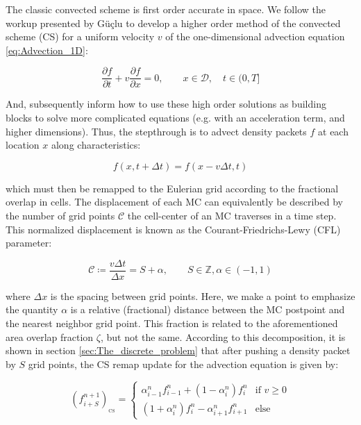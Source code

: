 \documentclass[11pt,titlepage]{report}
\begin{document}
\indent\indent The classic convected scheme is first order accurate in space. We follow the workup presented by G\"{u}\c{c}lu \cite{Guclu14} to develop a higher order method of the convected scheme (CS) for a uniform velocity $v$ of the one-dimensional advection equation \eqref{eq:Advection_1D}:

$$\frac{\partial f}{\partial t} + v\frac{\partial f}{\partial x} = 0 \label{eq:Advection_1D} , \qquad x\in\mathcal{D}, \quad t \in (0,T]$$

\noindent And, subsequently inform how to use these high order solutions as building blocks to solve more complicated equations (e.g. with an acceleration term, and higher dimensions). Thus, the stepthrough is to advect density packets $f$ at each location $x$ along characteristics:

$$f(x,t + \Delta t) = f(x - v\Delta t, t)$$

\noindent which must then be remapped to the Eulerian grid according to the fractional overlap in cells. The displacement of each MC can equivalently be described by the number of grid points $\mathcal{C}$ the cell-center of an MC traverses in a time step. This normalized displacement is known as the Courant-Friedrichs-Lewy (CFL) parameter:

\begin{equation}\mathcal{C} \coloneqq \frac{v\Delta t}{\Delta x} =  S + \alpha , \qquad S\in\mathbb{Z}, \alpha\in(-1,1)\label{eq:CFL_first}\end{equation}

\noindent where $\Delta x$ is the spacing between grid points. Here, we make a point to emphasize the quantity $\alpha$ is a relative (fractional) distance between the MC postpoint and the nearest neighbor grid point. This fraction is related to the aforementioned area overlap fraction $\zeta$, but not the same. According to this decomposition, it is shown in section \ref{sec:The_discrete_problem} that after pushing a density packet by $S$ grid points, the CS remap update for the advection equation is given by:

 \begin{equation}
\label{eq:CS_update_FD_alpha}
 (f_{i+S}^{n+1})_{_{\mathrm{CS}}} =
  \begin{cases}
   \alpha_{i-1}^{n} f_{i-1}^n + (1 - \alpha_i^n)f_i^n & \text{if } v \geq 0 \\[0.75em]
   (1 + \alpha_i^n)f_i^n - \alpha_{i+1}^n f_{i+1}^n & \text{else }
  \end{cases}
\end{equation}
\end{document}
